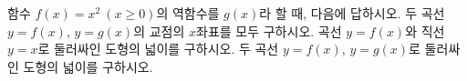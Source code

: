 함수 $f(x)=x^2\ (x\ge 0)$의 역함수를 $g(x)$라 할 때, 다음에 답하시오.
 두 곡선 $y=f(x)$, $y=g(x)$의 교점의 $x$좌표를 모두 구하시오.
 곡선 $y=f(x)$와 직선 $y=x$로 둘러싸인 도형의 넓이를 구하시오.
 두 곡선 $y=f(x)$, $y=g(x)$로 둘러싸인 도형의 넓이를 구하시오.
